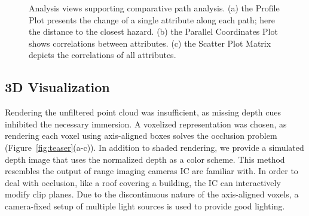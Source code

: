 \documentclass{egpubl}
\begin{document}
\begin{figure}
{	    \label{fig:overview:analysis:pcp}
	}
	\hfill
	\caption{Analysis views supporting comparative path analysis. (a) the Profile Plot presents the change of a single attribute along each path; here the distance to the closest hazard. (b) the Parallel Coordinates Plot shows correlations between attributes. (c) the Scatter Plot Matrix depicts the correlations of all attributes.}
\end{figure}

\subsection{3D Visualization} \label{sec:overview:3dvisualization}
 Rendering the unfiltered point cloud was insufficient, as missing depth cues inhibited the necessary immersion. A voxelized representation was chosen, as rendering each voxel using axis-aligned boxes solves the occlusion problem (Figure~\ref{fig:teaser}(a-c)). In addition to shaded rendering, we provide a simulated depth image that uses the normalized depth as a color scheme. This method resembles the output of range imaging cameras IC are familiar with. In order to deal with occlusion, like a roof covering a building, the IC can interactively modify clip planes. Due to the discontinuous nature of the axis-aligned voxels, a camera-fixed setup of multiple light sources is used to provide good lighting.
\end{document}
